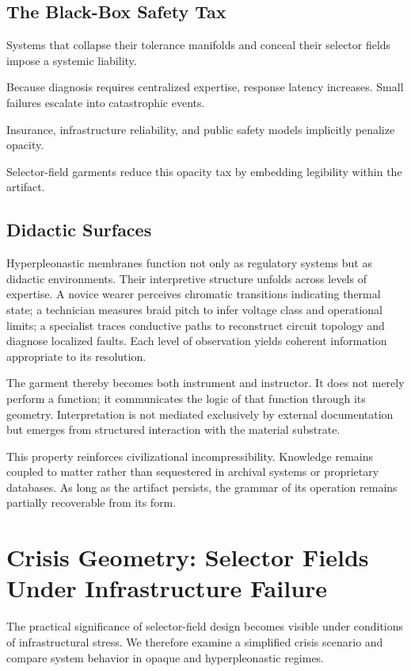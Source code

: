 \documentclass[11pt]{article}
\begin{document}
\subsection{The Black-Box Safety Tax}

Systems that collapse their tolerance manifolds and conceal their 
selector fields impose a systemic liability.

Because diagnosis requires centralized expertise, response latency 
increases. Small failures escalate into catastrophic events.

Insurance, infrastructure reliability, and public safety models 
implicitly penalize opacity.

Selector-field garments reduce this opacity tax by embedding 
legibility within the artifact.

\subsection{Didactic Surfaces}

Hyperpleonastic membranes function not only as regulatory systems but
as didactic environments. Their interpretive structure unfolds across
levels of expertise. A novice wearer perceives chromatic transitions
indicating thermal state; a technician measures braid pitch to infer
voltage class and operational limits; a specialist traces conductive
paths to reconstruct circuit topology and diagnose localized faults.
Each level of observation yields coherent information appropriate to
its resolution.

The garment thereby becomes both instrument and instructor. It does not
merely perform a function; it communicates the logic of that function
through its geometry. Interpretation is not mediated exclusively by
external documentation but emerges from structured interaction with the
material substrate.

This property reinforces civilizational incompressibility. Knowledge
remains coupled to matter rather than sequestered in archival systems or
proprietary databases. As long as the artifact persists, the grammar of
its operation remains partially recoverable from its form.

\section{Crisis Geometry: Selector Fields Under Infrastructure Failure}

The practical significance of selector-field design becomes visible 
under conditions of infrastructural stress. We therefore examine 
a simplified crisis scenario and compare system behavior in opaque 
and hyperpleonastic regimes.
\end{document}
